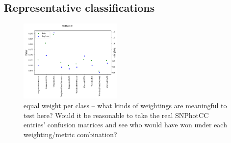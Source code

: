 \subsection{Representative classifications}
\label{sec:realresults}

\begin{figure}
	\begin{center}
		\includegraphics[width=0.45\textwidth]{./fig/SNPhotCC_res.png}
		\caption{equal weight per class -- what kinds of weightings are meaningful to test here?  Would it be reasonable to take the real SNPhotCC entries' confusion matrices and see who would have won under each weighting/metric combination?}
		\label{fig:real_metric_compare}
	\end{center}
\end{figure}

